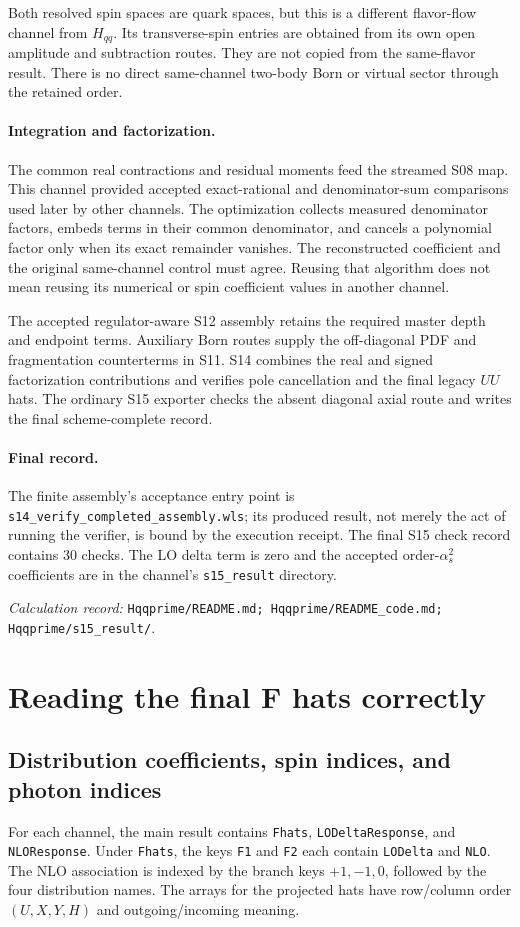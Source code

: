 \documentclass[11pt,a4paper]{article}
\newcommand{\as}{\alpha_s}
\newcommand{\code}[1]{{\small\nolinkurl{#1}}}
\newcommand{\pathref}[1]{\par{\footnotesize\textit{Calculation record:} \code{#1}.}\par}
\begin{document}
Both resolved spin spaces are quark spaces, but this is a different flavor-flow channel from $H_{qq}$. Its transverse-spin entries are obtained from its own open amplitude and subtraction routes. They are not copied from the same-flavor result. There is no direct same-channel two-body Born or virtual sector through the retained order.

\paragraph{Integration and factorization.}
The common real contractions and residual moments feed the streamed S08 map. This channel provided accepted exact-rational and denominator-sum comparisons used later by other channels. The optimization collects measured denominator factors, embeds terms in their common denominator, and cancels a polynomial factor only when its exact remainder vanishes. The reconstructed coefficient and the original same-channel control must agree. Reusing that algorithm does not mean reusing its numerical or spin coefficient values in another channel.

The accepted regulator-aware S12 assembly retains the required master depth and endpoint terms. Auxiliary Born routes supply the off-diagonal PDF and fragmentation counterterms in S11. S14 combines the real and signed factorization contributions and verifies pole cancellation and the final legacy $UU$ hats. The ordinary S15 exporter checks the absent diagonal axial route and writes the final scheme-complete record.

\paragraph{Final record.}
The finite assembly's acceptance entry point is \code{s14_verify_completed_assembly.wls}; its produced result, not merely the act of running the verifier, is bound by the execution receipt. The final S15 check record contains 30 checks. The LO delta term is zero and the accepted order-$\as^2$ coefficients are in the channel's \code{s15_result} directory.
\pathref{Hqqprime/README.md; Hqqprime/README_code.md; Hqqprime/s15_result/}

\section{Reading the final F hats correctly}
\subsection{Distribution coefficients, spin indices, and photon indices}
For each channel, the main result contains \code{Fhats}, \code{LODeltaResponse}, and \code{NLOResponse}. Under \code{Fhats}, the keys \code{F1} and \code{F2} each contain \code{LODelta} and \code{NLO}. The NLO association is indexed by the branch keys $+1,-1,0$, followed by the four distribution names. The arrays for the projected hats have row/column order $(U,X,Y,H)$ and outgoing/incoming meaning.
\end{document}
